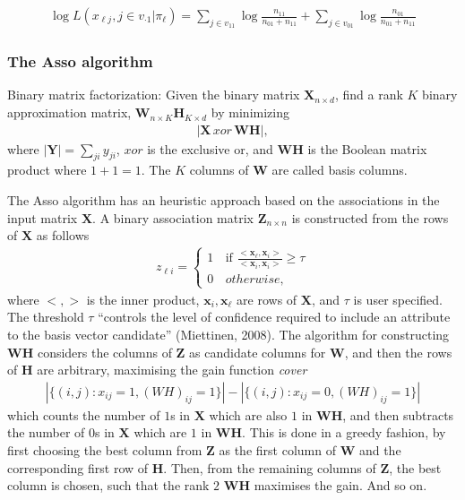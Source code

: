\documentclass[12pt]{article}
\begin{document}
\begin{align}
 \log L(x_{\ell j}, j \in v_{\cdot 1} | \pi_\ell) = \sum_{j \in v_{11}}  \log \frac{n_{11}}{n_{01}+ n_{11}} + \sum_{j \in v_{0 1}} \log \frac{n_{01}}{n_{01}+ n_{11}}
\end{align}


\subsubsection*{The Asso algorithm} %

Binary matrix factorization: Given the binary matrix $\mathbf{X}_{n \times d}$, find a  rank $K$ binary approximation matrix, $\mathbf{W}_{n \times K} \mathbf{H}_{K \times d}$ by minimizing 
\begin{align}
  |\mathbf{X}\, xor\, \mathbf{W} \mathbf{H}|,
\end{align}
where $|\mathbf{Y}| = \sum_{j i} y_{ji}$, $xor$ is the exclusive or, and $\mathbf{WH}$ is the Boolean matrix product where $1+1 = 1$.
The $K$ columns of $\mathbf{W}$ are called basis columns. 

The Asso algorithm \cite{Miettinen2008Discrete} \cite{Miettinen2014MDL4BMF} has an heuristic approach based on the associations in the input matrix $\mathbf{X}$. 
A binary association matrix $\mathbf{Z}_{n \times n}$ is constructed from the rows of $\mathbf{X}$ as follows
\begin{align} \label{eq:Association}
  z_{\ell i} =
   \begin{cases}
      1 & \text{if } \frac{<\mathbf{x}_{\ell},\mathbf{x}_i>}{<\mathbf{x}_{i},\mathbf{x}_{i}>} \geq \tau \\
      0 \, &otherwise,
    \end{cases}
\end{align}
where $<,>$ is the inner product, $\mathbf{x}_i,\mathbf{x}_{\ell}$ are rows of $\mathbf{X}$, and $\tau$ is user specified.
The threshold $\tau$ ``controls the level of confidence required to include an attribute to the basis vector candidate'' (Miettinen, 2008). 
The algorithm for constructing $\mathbf{WH}$ considers the columns of $\mathbf{Z}$ as candidate columns for $\mathbf{W}$, and then the rows of $\mathbf{H}$ are arbitrary, maximising the gain function {\it cover}
\begin{align}
   | \{ (i,j) : x_{ij} = 1, (WH)_{ij} = 1 \}| - | \{ (i,j) : x_{ij} = 0, (WH)_{ij} = 1\}|
\end{align}
which counts the number of $1$s in $\mathbf{X}$ which are also $1$ in $\mathbf{WH}$, and then subtracts the number of $0$s in $\mathbf{X}$ which are $1$ in $\mathbf{WH}$.
This is done in a greedy fashion, by first choosing the best column from $\mathbf{Z}$ as the first column of $\mathbf{W}$ and the corresponding first row of $\mathbf{H}$.
Then, from the remaining columns of  $\mathbf{Z}$, the best column is chosen, such that the rank $2$ $\mathbf{WH}$ maximises the gain. 
And so on. 
\end{document}
